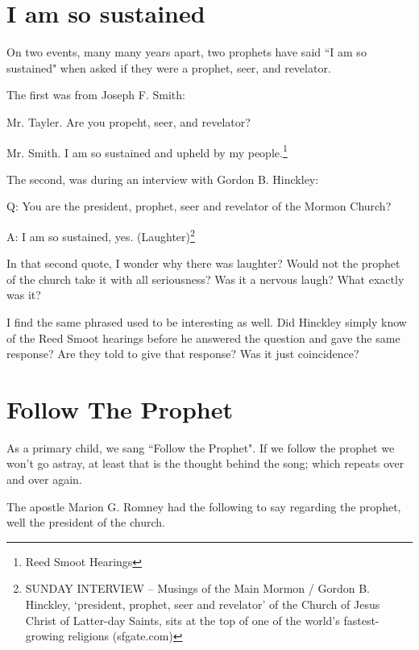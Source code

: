 \section{I am so sustained}

On two events, many many years apart, two prophets have said ``I am so sustained"
when asked if they were a prophet, seer, and revelator.

The first was from Joseph F. Smith:

\begin{displayquote}
Mr. Tayler. Are you propeht, seer, and revelator?

Mr. Smith. I am so sustained and upheld by my people.\footnote{Reed Smoot Hearings}
\end{displayquote}

The second, was during an interview with Gordon B. Hinckley:

\begin{displayquote}
Q: You are the president, prophet, seer and revelator of the Mormon Church?

A: I am so sustained, yes. (Laughter)\footnote{SUNDAY INTERVIEW -- Musings of the 
Main Mormon / Gordon B. Hinckley, `president, prophet, seer and revelator' of the 
Church of Jesus Christ of Latter-day Saints, sits at the top of one of the world's 
fastest-growing religions (sfgate.com) }
\end{displayquote}

In that second quote, I wonder why there was laughter? Would not the prophet of the
church take it with all seriousness? Was it a nervous laugh? What exactly was it?

I find the same phrased used to be interesting as well. Did Hinckley simply know of
the Reed Smoot hearings before he answered the question and gave the same response?
Are they told to give that response? Was it just coincidence?

\section{Follow The Prophet}

As a primary child, we sang ``Follow the Prophet". If we follow the prophet we won't
go astray, at least that is the thought behind the song; which repeats over and over
again.

The apostle Marion G. Romney had the following to say regarding the prophet, well the
president of the church.

